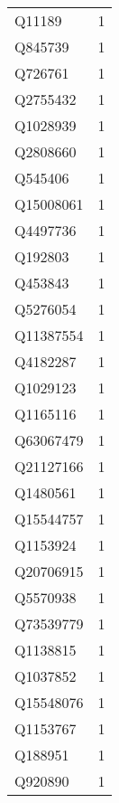 \begin{tabular}{lr}
      Q11189 &                             1 \\
     Q845739 &                             1 \\
     Q726761 &                             1 \\
    Q2755432 &                             1 \\
    Q1028939 &                             1 \\
    Q2808660 &                             1 \\
     Q545406 &                             1 \\
   Q15008061 &                             1 \\
    Q4497736 &                             1 \\
     Q192803 &                             1 \\
     Q453843 &                             1 \\
    Q5276054 &                             1 \\
   Q11387554 &                             1 \\
    Q4182287 &                             1 \\
    Q1029123 &                             1 \\
    Q1165116 &                             1 \\
   Q63067479 &                             1 \\
   Q21127166 &                             1 \\
    Q1480561 &                             1 \\
   Q15544757 &                             1 \\
    Q1153924 &                             1 \\
   Q20706915 &                             1 \\
    Q5570938 &                             1 \\
   Q73539779 &                             1 \\
    Q1138815 &                             1 \\
    Q1037852 &                             1 \\
   Q15548076 &                             1 \\
    Q1153767 &                             1 \\
     Q188951 &                             1 \\
     Q920890 &                             1 \\

\end{tabular}
